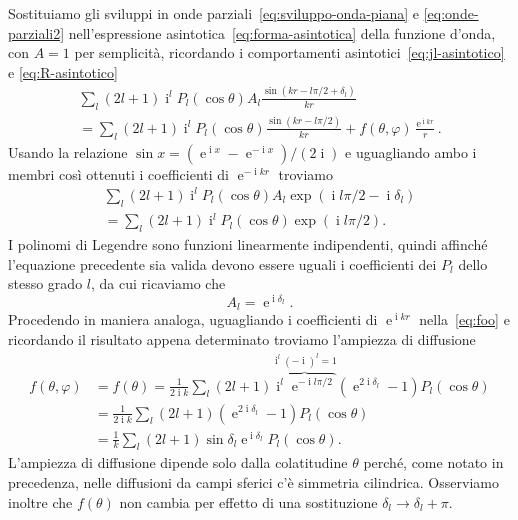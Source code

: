 \documentclass[a4paper,fleqn,twoside,12pt]{article}
\renewcommand{\phi}{\varphi}
\DeclareMathOperator{\e}{\mathrm{e}} %
\DeclareMathOperator{\uimm}{\mathrm{i}} %
\begin{document}
Sostituiamo gli sviluppi in onde parziali~\eqref{eq:sviluppo-onda-piana} e
\eqref{eq:onde-parziali2} nell'espressione
asintotica~\eqref{eq:forma-asintotica} della funzione d'onda, con $A = 1$ per
semplicità, ricordando i comportamenti asintotici~\eqref{eq:jl-asintotico} e
\eqref{eq:R-asintotico}
\begin{multline}
  \label{eq:foo}
  \sum_{l}(2l+1)\uimm^{l}P_{l}(\cos\theta)A_{l}\frac{\sin(kr - l\pi/2 +
    \delta_{l})}{kr} \\
  = \sum_{l}(2l+1)\uimm^{l} P_{l}(\cos\theta)\frac{\sin(kr - l\pi/2)}{kr} +
  f(\theta,\phi)\frac{\e^{\uimm kr}}{r}.
\end{multline}
Usando la relazione $\sin x = (\e^{\uimm x} - \e^{-\uimm x})/(2\uimm)$ e
uguagliando ambo i membri così ottenuti i coefficienti di $\e^{-\uimm kr}$
troviamo
\begin{multline}
  \sum_{l}(2l+1)\uimm^{l}P_{l}(\cos\theta)A_{l}\exp(\uimm l\pi/2 -
  \uimm\delta_{l}) \\
  = \sum_{l}(2l+1)\uimm^{l}P_{l}(\cos\theta)\exp(\uimm l\pi/2).
\end{multline}
I polinomi di Legendre sono funzioni linearmente indipendenti, quindi affinché
l'equazione precedente sia valida devono essere uguali i coefficienti dei
$P_{l}$ dello stesso grado $l$, da cui ricaviamo che
\begin{equation}
  A_{l} = \e^{\uimm \delta_{l}}.
\end{equation}
Procedendo in maniera analoga, uguagliando i coefficienti di $\e^{\uimm kr}$
nella~\eqref{eq:foo} e ricordando il risultato appena determinato troviamo
l'ampiezza di diffusione
\begin{equation}
  \label{eq:ampiezza-diffusione-op}
  \begin{split}
    f(\theta,\phi) &= f(\theta) = \frac{1}{2\uimm k}\sum_{l}(2l+1)
    \overbrace{\uimm^{l}\e^{-\uimm l\pi/2}}^{\uimm^{l}(-\uimm)^{l}=1}
    (\e^{2\uimm\delta_{l}} - 1)P_{l}(\cos\theta) \\
    &= \frac{1}{2\uimm k}\sum_{l}(2l+1)(\e^{2\uimm\delta_{l}} - 1)
    P_{l}(\cos\theta) \\
    &= \frac{1}{k} \sum_{l} (2l+1) \sin\delta_{l} \e^{\uimm\delta_{l}}
    P_{l}(\cos\theta).
  \end{split}
\end{equation}
L'ampiezza di diffusione dipende solo dalla colatitudine $\theta$ perché, come
notato in precedenza, nelle diffusioni da campi sferici c'è simmetria
cilindrica.  Osserviamo inoltre che $f(\theta)$ non cambia per effetto di una
sostituzione $\delta_{l} \to \delta_{l} + \pi$.
\end{document}

